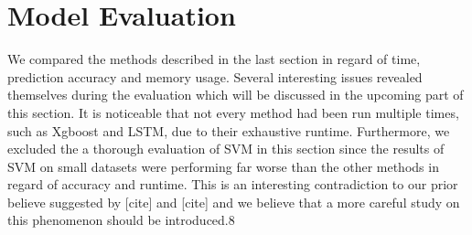 \documentclass[letterpaper]{article} %
\begin{document}
\begin{table}[htb]
\caption{Example of TF/IDF Feature Matrix} %
\end{table}

\begin{table}[htb]
\caption{Example of Bag-of-word Feature Matrix} %
\end{table}

\section{Model Evaluation}
We compared the methods described in the last section in regard of time, prediction accuracy and memory usage. Several interesting issues revealed themselves during the evaluation which will be discussed in the upcoming part of this section. It is noticeable that not every method had been run multiple times, such as Xgboost and LSTM, due to their exhaustive runtime. Furthermore, we excluded the a thorough evaluation of SVM in this section since the results of SVM on small datasets were performing far worse than the other methods in regard of accuracy and runtime. This is an interesting contradiction to our prior believe suggested by [cite] and [cite] and we believe that a more careful study on this phenomenon should be introduced.8
\end{document}
